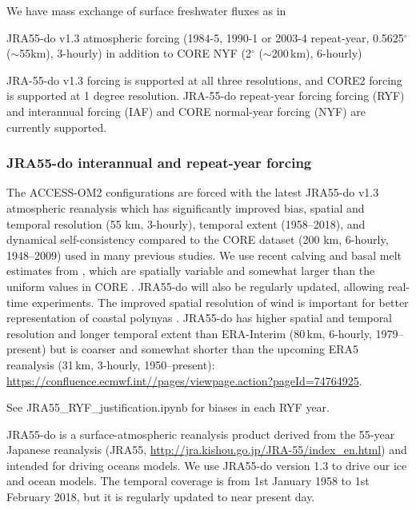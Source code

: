 \documentclass[11pt]{article}
\newcommand{\TODO}[1]{\note{\textcolor{blue}{\textsf{\textbf{TODO: #1}}}}}
\newcommand{\FIXME}[1]{\note{\textcolor{red}{\textsf{\textbf{FIXME: #1}}}}}
\begin{document}
We have mass exchange of surface freshwater fluxes as in \citet{BiMarslandUotilaOFarrellFiedlerSullivanGriffiesZhouHirst2013a} \TODO{confirm}

JRA55-do v1.3 atmospheric forcing (1984-5, 1990-1 or 2003-4 repeat-year, 0.5625$^\circ$ ($\sim$55km), 3-hourly) in addition to CORE NYF (2$^\circ$ ($\sim$200\,km), 6-hourly)

JRA-55-do v1.3 forcing is supported at all three resolutions, and CORE2 forcing is supported at 1 degree resolution. 
JRA-55-do repeat-year forcing forcing (RYF) and interannual forcing (IAF) and CORE normal-year forcing (NYF) are currently supported. \FIXME{what about CORE IAF?}

\subsubsection{JRA55-do interannual and repeat-year forcing}

The ACCESS-OM2 configurations are forced with the latest JRA55-do v1.3 atmospheric reanalysis \citep{TsujinoETAL2018a} which has significantly improved bias, spatial and temporal resolution (55 km, 3-hourly), temporal extent (1958--2018), and dynamical self-consistency compared to the CORE dataset (200 km, 6-hourly, 1948--2009) used in many previous studies. We use recent calving and basal melt estimates from \citet{DepoorterBamberGriggsLenaertsLigtenbergBroekeMoholdt2013a}, which are spatially variable and somewhat larger than the uniform values in CORE \citep{TsujinoETAL2018a}. JRA55-do will also be regularly updated, allowing real-time experiments. The improved spatial resolution of wind is important for better representation of coastal polynyas \citep{StosselZhangVihma2011a, ZhangVihmaStosselUotila2015a}.
JRA55-do has higher spatial and temporal resolution and longer temporal extent than ERA-Interim (80\,km, 6-hourly, 1979--present) %
but is coarser and somewhat shorter than the upcoming ERA5 reanalysis (31\,km, 3-hourly, 1950--present): \url{https://confluence.ecmwf.int//pages/viewpage.action?pageId=74764925}.%


See JRA55_RYF_justification.ipynb for biases in each RYF year.

JRA55-do \citep{TsujinoETAL2018a} is a surface-atmospheric reanalysis product derived from the 55-year Japanese reanalysis (JRA55, \url{http://jra.kishou.go.jp/JRA-55/index_en.html}) and intended for driving oceans models. 
We use JRA55-do version 1.3 to drive our ice and ocean models.
The temporal coverage is from 1st January 1958 to 1st February 2018, but it is regularly updated to near present day.
\end{document}
